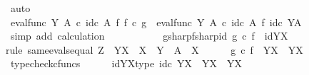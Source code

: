 \begin{isabellebody}
\ auto\isanewline
\ \ \ \ \ \ \isamarkupfalse%
\ \isamarkupfalse%
\ {\isachardoublequoteopen}eval{\isacharunderscore}{\kern0pt}func\ Y\ A\ {\isasymcirc}\isactrlsub c\ id\isactrlsub c\ A\ {\isasymtimes}\isactrlsub f\ f\isactrlsup {\isasymsharp}\ {\isasymcirc}\isactrlsub c\ g\isactrlsup {\isasymsharp}\ {\isacharequal}{\kern0pt}\ eval{\isacharunderscore}{\kern0pt}func\ Y\ A\ {\isasymcirc}\isactrlsub c\ id\isactrlsub c\ A\ {\isasymtimes}\isactrlsub f\ id\isactrlsub c\ {\isacharparenleft}{\kern0pt}Y\isactrlbsup A\isactrlesup {\isacharparenright}{\kern0pt}{\isachardoublequoteclose}\isanewline
\ \ \ \ \ \ \ \ \isamarkupfalse%
\ {\isacharparenleft}{\kern0pt}simp\ add{\isacharcolon}{\kern0pt}\ calculation{\isacharparenright}{\kern0pt}\isanewline
\ \ \ \ \isamarkupfalse%
\isanewline
\ \ \isamarkupfalse%
\isanewline
\isanewline
\ \ \isamarkupfalse%
\ gsharp{\isacharunderscore}{\kern0pt}fsharp{\isacharunderscore}{\kern0pt}id{\isacharcolon}{\kern0pt}\ {\isachardoublequoteopen}g\isactrlsup {\isasymsharp}\ {\isasymcirc}\isactrlsub c\ f\isactrlsup {\isasymsharp}\ {\isacharequal}{\kern0pt}\ id{\isacharparenleft}{\kern0pt}Y\isactrlbsup X\isactrlesup {\isacharparenright}{\kern0pt}{\isachardoublequoteclose}\isanewline
\ \ \isamarkupfalse%
{\isacharparenleft}{\kern0pt}rule\ same{\isacharunderscore}{\kern0pt}evals{\isacharunderscore}{\kern0pt}equal{\isacharbrackleft}{\kern0pt}\ Z\ {\isacharequal}{\kern0pt}\ {\isachardoublequoteopen}Y\isactrlbsup X\isactrlesup {\isachardoublequoteclose}{\isacharcomma}{\kern0pt}\ \ X\ {\isacharequal}{\kern0pt}\ Y{\isacharcomma}{\kern0pt}\ \ A\ {\isacharequal}{\kern0pt}\ X{\isacharbrackright}{\kern0pt}{\isacharparenright}{\kern0pt}\isanewline
\ \ \ \ \isamarkupfalse%
\ {\isachardoublequoteopen}g\isactrlsup {\isasymsharp}\ {\isasymcirc}\isactrlsub c\ f\isactrlsup {\isasymsharp}\ {\isacharcolon}{\kern0pt}\ Y\isactrlbsup X\isactrlesup \ {\isasymrightarrow}\ Y\isactrlbsup X\isactrlesup {\isachardoublequoteclose}\isanewline
\ \ \ \ \ \ \isamarkupfalse%
\ typecheck{\isacharunderscore}{\kern0pt}cfuncs\isanewline
\ \ \ \ \isamarkupfalse%
\ idYX{\isacharunderscore}{\kern0pt}type{\isacharcolon}{\kern0pt}\ {\isachardoublequoteopen}id\isactrlsub c\ {\isacharparenleft}{\kern0pt}Y\isactrlbsup X\isactrlesup {\isacharparenright}{\kern0pt}\ {\isacharcolon}{\kern0pt}\ Y\isactrlbsup X\isactrlesup \ {\isasymrightarrow}\ Y\isactrlbsup X\isactrlesup {\isachardoublequoteclose}\isanewline

\end{isabellebody}
